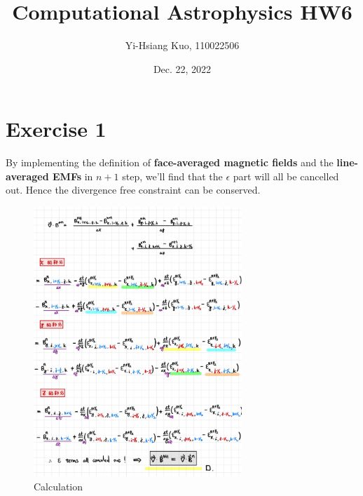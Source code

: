 \documentclass[aps,12pt,prd,nofootinbib,bibnotes, amsmath,amssymb,showpacs,superscriptaddress,floatfix]{revtex4-2}
\begin{document}
\title{Computational Astrophysics HW6}
\author{Yi-Hsiang Kuo, 110022506}
\date{Dec. 22, 2022}
\maketitle
\section{Exercise 1}
By implementing the definition of  {\bf{face-averaged magnetic fields}} and the {\bf{line-averaged EMFs}} in $n+1$ step, we'll find that the $\epsilon$ part will all be cancelled out. Hence the divergence free constraint can be conserved. 
\begin{figure}[H] 
\centering 
\includegraphics[width=0.7\textwidth]{EX1} 
\caption{Calculation}  
\end{figure}
    
\end{document}
